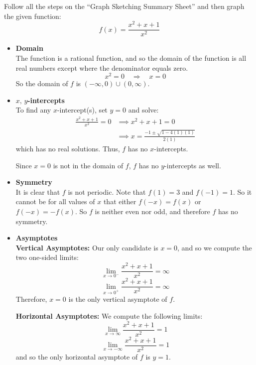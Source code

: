 \documentclass[handout,nooutcomes]{ximera}
\renewenvironment{freeResponse}{
\ifhandout\setbox0\vbox\bgroup\else
\begin{trivlist}\item[\hskip \labelsep\bfseries Solution:\hspace{2ex}]
\fi}
{\ifhandout\egroup\else
\end{trivlist}
\fi}
\newcommand{\dfn}{\textbf}
\begin{document}
\begin{problem}
  Follow all the steps on the ``Graph Sketching Summary Sheet'' and then graph the given function:
  \[ 
    f(x) = \frac{x^2 + x + 1}{x^2}
  \]
  \begin{freeResponse}
    \begin{itemize}
      \item  
        \dfn{Domain}  \\
        The function is a rational function, and so the domain of the function is all real numbers except where the denominator equals zero.
        \[
          x^2 = 0 \quad \Longrightarrow \quad x=0
        \]
	So the domain of $f$ is $(-\infty ,0)\cup (0,\infty )$.


      \item
        \dfn{$x,\, y$-intercepts}  \\
        To find any $x$-intercept(s), set $y=0$ and solve:
        \begin{align*}
          \frac{x^2 + x + 1}{x^2} = 0 &\implies x^2 + x + 1 = 0 \\
          &\implies x = \frac{-1 \pm \sqrt{1-4(1)(1)}}{2(1)}
        \end{align*}
	which has no real solutions.
        Thus, $f$ has no $x$-intercepts.
			
	Since $x=0$ is not in the domain of $f$, $f$ has no $y$-intercepts as well.
 
     \item 
       \dfn{Symmetry}  \\

       It is clear that $f$ is not periodic.
       Note that $f(1) = 3$ and $f(-1) = 1$.
       So it cannot be for all values of $x$ that either $f(-x) = f(x)$ or $f(-x) = -f(x)$.
       So $f$ is neither even nor odd, and therefore $f$ has no symmetry.
			
     \item
       \dfn{Asymptotes}  \\

       \dfn{Vertical Asymptotes:}  Our only candidate is $x=0$, and so we compute the two one-sided limits:
       \[
         \lim_{x \to 0^-} \frac{x^2+x+1}{x^2} = \infty 
       \]
       \[
         \lim_{x \to 0^+} \frac{x^2+x+1}{x^2} = \infty
       \]
       Therefore, $x=0$ is the only vertical asymptote of $f$.

       \dfn{Horizontal Asymptotes:}  We compute the following limits:
       \[
         \lim_{x \to \infty} \frac{x^2+x+1}{x^2} = 1
       \]
       \[
         \lim_{x \to -\infty} \frac{x^2+x+1}{x^2} = 1
       \]
       and so the only horizontal asymptote of $f$ is $y=1$.
			

\end{itemize}
\end{freeResponse}
\end{problem}
\end{document}
